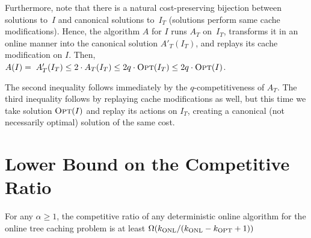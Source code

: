 Furthermore, note that there is a natural cost-pre\-serv\-ing bijection
between solutions to~$I$ and canonical solutions to~$I_T$ (solutions perform
same cache modifications). Hence, the algorithm $A$ for $I$ runs $A_T$
on~$I_T$, transforms it in an online manner into the canonical solution $A'_T(I_T)$, 
and replays its cache modification on $I$. Then, 
$A(I) = \; A'_T(I_T) \leq 2 \cdot A_T(I_T) 
\leq 2 q \cdot \textsc{Opt}(I_T) \leq 2 q \cdot \textsc{Opt}(I)$.

The second inequality follows immediately by the $q$-com\-pe\-ti\-ti\-ve\-ness
of $A_T$. The third inequality follows by replaying cache modifications as
well, but this time we take solution $\textsc{Opt}(I)$ and replay its actions on $I_T$,
creating a canonical (not necessarily optimal) solution of the same cost.



\section{Lower Bound on the Competitive Ratio}
\label{sec:lower-bound-on-the-problem}

\begin{theorem}
For any $\alpha \geq 1$, the competitive ratio of any deterministic online
algorithm for the online tree caching problem is at least
$\Omega(k_\textnormal{ONL}/(k_\textnormal{ONL}-k_\textnormal{OPT}+1))$
\end{theorem}


